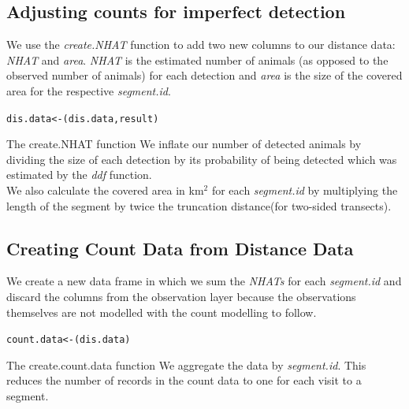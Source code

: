 
\subsection{Adjusting counts for imperfect detection}
\noindent We use the \textit{create.NHAT} function to add two new columns to our distance data: \textit{NHAT} and \textit{area}. \textit{NHAT} is the estimated number of animals (as opposed to the observed number of animals) for each detection and \textit{area} is the size of the covered area for the respective \textit{segment.id}.\\
\begin{knitrout}\footnotesize
{}\color{fgcolor}
\begin{kframe}
\begin{alltt}
dis.data <- (dis.data,result)
\end{alltt}
\end{kframe}
\end{knitrout}
\begin{block}{The create.NHAT function}
We inflate our number of detected animals by dividing the size of each detection by its probability of being detected which was estimated by the \textit{ddf} function.\\
We also calculate the covered area in km$^2$ for each \textit{segment.id} by multiplying the length of the segment by twice the truncation distance(for two-sided transects). 
\end{block}

\subsection{Creating Count Data from Distance Data}
\noindent We create a new data frame in which we sum the \textit{NHATs} for each \textit{segment.id} and discard the columns from the observation layer because the observations themselves are not modelled with the count modelling to follow. 
\begin{knitrout}\footnotesize
{}\color{fgcolor}
\begin{kframe}
\begin{alltt}
count.data <- (dis.data)
\end{alltt}
\end{kframe}
\end{knitrout}
\begin{block}{The create.count.data function}
We aggregate the data by \textit{segment.id}. This reduces the number of records in the count data to one for each visit to a segment. 
\end{block}


